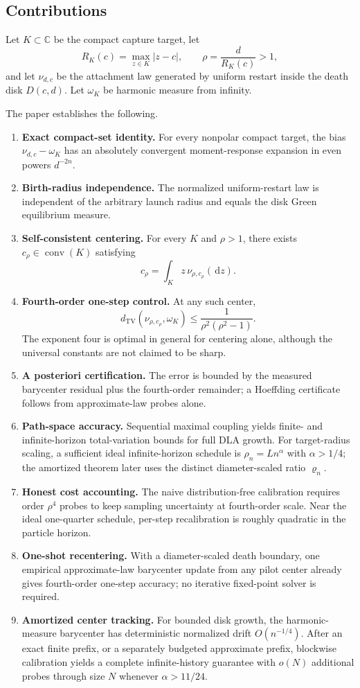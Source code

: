 \documentclass[11pt]{article}
\theoremstyle{mainthm}
\theoremstyle{definition}
\theoremstyle{remark}
\newcommand{\C}{\mathbb C}
\newcommand{\dd}{\,\mathrm d}
\newcommand{\dTV}{d_{\mathrm{TV}}}
\newcommand{\conv}{\operatorname{conv}}
\begin{document}
\subsection{Contributions}

Let $K\subset\C$ be the compact capture target, let
\[
 R_K(c)=\max_{z\in K}|z-c|,
 \qquad
 \rho=\frac{d}{R_K(c)}>1,
\]
and let $\nu_{d,c}$ be the attachment law generated by uniform restart inside the death disk $D(c,d)$. Let $\omega_K$ be harmonic measure from infinity.

The paper establishes the following.

\begin{enumerate}
  \item \textbf{Exact compact-set identity.} For every nonpolar compact target, the bias $\nu_{d,c}-\omega_K$ has an absolutely convergent moment-response expansion in even powers $d^{-2n}$.
  \item \textbf{Birth-radius independence.} The normalized uniform-restart law is independent of the arbitrary launch radius and equals the disk Green equilibrium measure.
  \item \textbf{Self-consistent centering.} For every $K$ and $\rho>1$, there exists $c_\rho\in\conv(K)$ satisfying
  \[
    c_\rho=\int_K z\,\nu_{\rho,c_\rho}(\dd z).
  \]
  \item \textbf{Fourth-order one-step control.} At any such center,
  \[
    \dTV(\nu_{\rho,c_\rho},\omega_K)
    \le \frac{1}{\rho^2(\rho^2-1)}.
  \]
  The exponent four is optimal in general for centering alone, although the universal constants are not claimed to be sharp.
  \item \textbf{A posteriori certification.} The error is bounded by the measured barycenter residual plus the fourth-order remainder; a Hoeffding certificate follows from approximate-law probes alone.
  \item \textbf{Path-space accuracy.} Sequential maximal coupling yields finite- and infinite-horizon total-variation bounds for full DLA growth. For target-radius scaling, a sufficient ideal infinite-horizon schedule is $\rho_n=L n^\alpha$ with $\alpha>1/4$; the amortized theorem later uses the distinct diameter-scaled ratio $\varrho_n$.
  \item \textbf{Honest cost accounting.} The naive distribution-free calibration requires order $\rho^4$ probes to keep sampling uncertainty at fourth-order scale. Near the ideal one-quarter schedule, per-step recalibration is roughly quadratic in the particle horizon.
  \item \textbf{One-shot recentering.} With a diameter-scaled death boundary, one empirical approximate-law barycenter update from any pilot center already gives fourth-order one-step accuracy; no iterative fixed-point solver is required.
  \item \textbf{Amortized center tracking.} For bounded disk growth, the harmonic-measure barycenter has deterministic normalized drift $O(n^{-1/4})$. After an exact finite prefix, or a separately budgeted approximate prefix, blockwise calibration yields a complete infinite-history guarantee with $o(N)$ additional probes through size $N$ whenever $\alpha>11/24$.
\end{enumerate}
\end{document}
